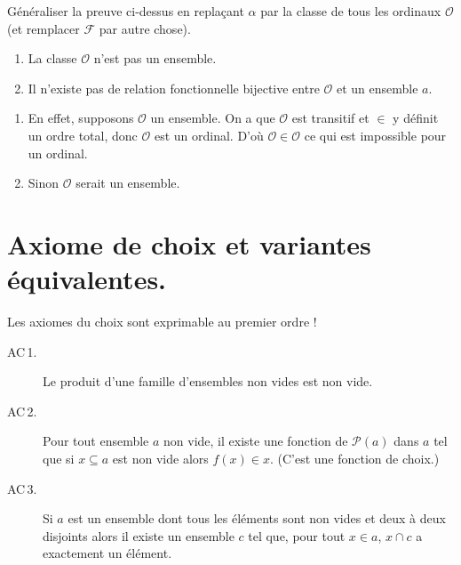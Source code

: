\documentclass[./main]{subfiles}
\begin{document}
  \begin{exo}
    Généraliser la preuve ci-dessus en replaçant $\alpha$ par la classe de tous les ordinaux $\mathcal{O}$ (et remplacer $\mathcal{F}$ par autre chose).
  \end{exo}

  \begin{prop}
    \begin{enumerate}
      \item La classe $\mathcal{O}$ n'est pas un ensemble.
      \item Il n'existe pas de relation fonctionnelle bijective entre $\mathcal{O}$ et un ensemble $a$.
    \end{enumerate}
  \end{prop}
  \begin{prv}
    \begin{enumerate}
      \item En effet, supposons $\mathcal{O}$ un ensemble. On a que $\mathcal{O}$ est transitif et $\in$ y définit un ordre total, donc $\mathcal{O}$ est un ordinal. D'où $\mathcal{O} \in \mathcal{O}$ ce qui est impossible pour un ordinal.
      \item Sinon $\mathcal{O}$ serait un ensemble.
    \end{enumerate}
  \end{prv}

  \section{Axiome de choix et variantes équivalentes.}

  Les axiomes du choix sont exprimable au premier ordre !

  \begin{description}
    \item[AC\,1.] \label{AC1}
      Le produit d'une famille d'ensembles non vides est non vide.
  \end{description}

  \begin{description}
    \item[AC\,2.] \label{AC2}
      Pour tout ensemble $a$ non vide, il existe une fonction de $\mathcal{P}(a)$ dans $a$ tel que si $x \subseteq a$ est non vide alors $f(x) \in x$.
      (C'est une fonction de choix.)
  \end{description}

  \begin{description}
    \item[AC\,3.] \label{AC3}
      Si $a$ est un ensemble dont tous les éléments sont non vides et deux à deux disjoints alors il existe un ensemble $c$ tel que, pour tout $x \in a$, $x \cap c$ a exactement un élément.
  \end{description}
\end{document}
